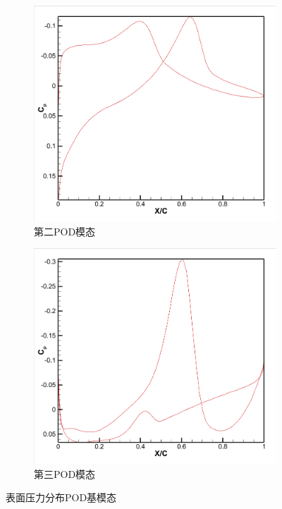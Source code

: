 \begin{figure}[H]
\begin{subfigure}[b]{0.32\textwidth}
        \includegraphics[width=\textwidth]{image/基压力分布图/双变量表面压力基2.png}
        \caption{第二POD模态}
    \end{subfigure}
    \begin{subfigure}[b]{0.32\textwidth}
        \includegraphics[width=\textwidth]{image/基压力分布图/双变量表面压力基3.png}
        \caption{第三POD模态}
    \end{subfigure}
    \caption{\songti 表面压力分布POD基模态}
    \label{fig:double_surface_pod_modes}
\end{figure}

